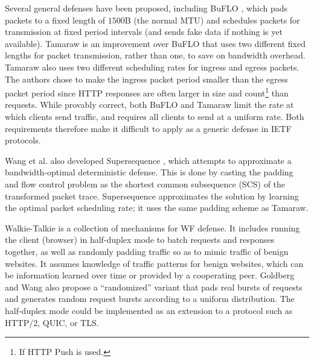 \documentclass[runningheads]{llncs}
\begin{document}
Several general defenses have been proposed, including BuFLO \cite{dyer2012peek}, which pads packets to
a fixed length of $1500$B (the normal MTU) and schedules packets for transmission at fixed period intervals
(and sends fake data if nothing is yet available). Tamaraw \cite{wang2016website} is an improvement over BuFLO
that uses two different fixed lengths for packet transmission, rather than one, to save on bandwidth overhead.
Tamaraw also uses two different scheduling rates for ingress and egress packets. The authors chose to make
the ingress packet period smaller than the egress packet period since HTTP responses are often larger in size
and count\footnote{If HTTP Push is used.} than requests. While provably correct, both BuFLO and Tamaraw limit
the rate at which clients send traffic, and requires all clients to send at a uniform rate. Both requirements
therefore make it difficult to apply as a generic defense in IETF protocols.

Wang et al. also developed Supersequence \cite{wang2016website}, which attempts to approximate a bandwidth-optimal
deterministic defense. This is done by casting the padding and flow control problem as the shortest common
subsequence (SCS) of the transformed packet trace. Supersequence approximates the solution by learning the optimal
packet scheduling rate; it uses the same padding scheme as Tamaraw.

Walkie-Talkie \cite{wang2015walkie} is a collection of mechanisms for WF defense. It includes running
the client (browser) in half-duplex mode to batch requests and responses together, as well as randomly
padding traffic so as to mimic traffic of benign websites. It assumes knowledge of traffic patterns for
benign websites, which can be information learned over time or provided by a cooperating peer. Goldberg
and Wang also propose a ``randomized'' variant that pads real bursts of requests and generates random
request bursts according to a uniform distribution. The half-duplex mode could be implemented as an extension
to a protocol such as HTTP/2, QUIC, or TLS.
\end{document}
